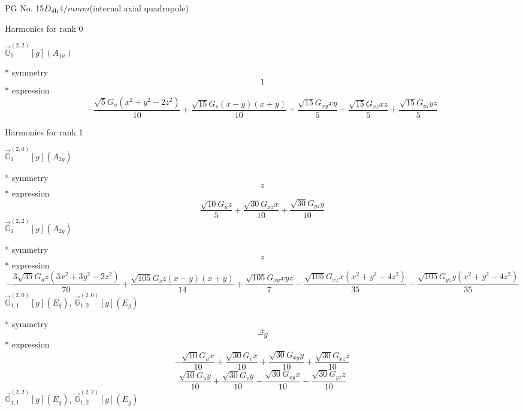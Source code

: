 \documentclass[fleqn,8pt]{jsarticle}
\begin{document}
\setcounter{MaxMatrixCols}{32}

\renewcommand{\tablename}{Table~}
\renewcommand{\figurename}{Figure~}
\begin{center}
\LARGE
PG No. 15\quad$D_{\rm 4h}$\quad$4/mmm$\quad[ tetragonal ] (internal axial quadrupole)
\end{center}

\noindent * Harmonics for rank 0

\noindent\quad $\vec{\mathbb{G}}_{0}^{(2,2)}[g](A_{1u})$

\noindent\quad ** symmetry
\begin{dmath*}
1
\end{dmath*}
\noindent\quad ** expression
\begin{dmath*}
- \frac{\sqrt{5} G_{u} \left(x^{2} + y^{2} - 2 z^{2}\right)}{10} + \frac{\sqrt{15} G_{v} \left(x - y\right) \left(x + y\right)}{10} + \frac{\sqrt{15} G_{xy} x y}{5} + \frac{\sqrt{15} G_{xz} x z}{5} + \frac{\sqrt{15} G_{yz} y z}{5}
\end{dmath*}

\noindent * Harmonics for rank 1

\noindent\quad $\vec{\mathbb{G}}_{1}^{(2,0)}[g](A_{2g})$

\noindent\quad ** symmetry
\begin{dmath*}
z
\end{dmath*}
\noindent\quad ** expression
\begin{dmath*}
\frac{\sqrt{10} G_{u} z}{5} + \frac{\sqrt{30} G_{xz} x}{10} + \frac{\sqrt{30} G_{yz} y}{10}
\end{dmath*}
\noindent\quad $\vec{\mathbb{G}}_{1}^{(2,2)}[g](A_{2g})$

\noindent\quad ** symmetry
\begin{dmath*}
z
\end{dmath*}
\noindent\quad ** expression
\begin{dmath*}
- \frac{3 \sqrt{35} G_{u} z \left(3 x^{2} + 3 y^{2} - 2 z^{2}\right)}{70} + \frac{\sqrt{105} G_{v} z \left(x - y\right) \left(x + y\right)}{14} + \frac{\sqrt{105} G_{xy} x y z}{7} - \frac{\sqrt{105} G_{xz} x \left(x^{2} + y^{2} - 4 z^{2}\right)}{35} - \frac{\sqrt{105} G_{yz} y \left(x^{2} + y^{2} - 4 z^{2}\right)}{35}
\end{dmath*}
\noindent\quad $\vec{\mathbb{G}}_{1,1}^{(2,0)}[g](E_{g})$, $\vec{\mathbb{G}}_{1,2}^{(2,0)}[g](E_{g})$

\noindent\quad ** symmetry
\begin{dmath*}
x
\end{dmath*}
\begin{dmath*}
- y
\end{dmath*}
\noindent\quad ** expression
\begin{dmath*}
- \frac{\sqrt{10} G_{u} x}{10} + \frac{\sqrt{30} G_{v} x}{10} + \frac{\sqrt{30} G_{xy} y}{10} + \frac{\sqrt{30} G_{xz} z}{10}
\end{dmath*}
\begin{dmath*}
\frac{\sqrt{10} G_{u} y}{10} + \frac{\sqrt{30} G_{v} y}{10} - \frac{\sqrt{30} G_{xy} x}{10} - \frac{\sqrt{30} G_{yz} z}{10}
\end{dmath*}
\noindent\quad $\vec{\mathbb{G}}_{1,1}^{(2,2)}[g](E_{g})$, $\vec{\mathbb{G}}_{1,2}^{(2,2)}[g](E_{g})$
\end{document}
